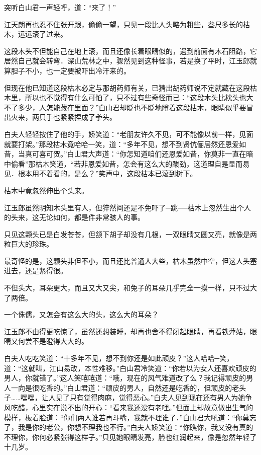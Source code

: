 \documentclass[12pt,oneside]{book}
\begin{document}
突听白山君一声轻呼，道：``来了！''

江天朗再也忍不住张开跟，偷偷一望，只见一段比人头略为粗些，叁尺多长的枯木，远远滚了过来。

这段木头不但能自己在地上滚，而且还像长着眼睛似的，遇到前面有木石阻路，它居然自己就会转弯．深山荒林之中，骤然见到这种怪事，若是换了平时，江玉郎就算胆子不小，也一定要被吓出冷汗来的。

但现在他已知道这段枯木必定与那胡药师有关，已猜出胡药师说不定就藏在这段枯木里，所以也不觉得有什么可怕了，只不过有些奇怪而已：``这段木头比枕头也大不了多少，人怎能藏在里面？''白山君却眨也不眨地瞪着这段枯木，眼睛似乎要冒出火来，两只手也紧紧捏成了拳头。

白夫人轻轻按住了他的手，娇笑道：``老朋友许久不见，可不能像以前一样，见面就要打架。''那段枯木竟哈哈一笑，道：``多年不见，想不到贤伉俪居然还恩爱如昔，当真可喜可贺。''白山君大声道：``你怎知道咱们还恩爱如昔，你莫非一直在暗中偷看''那枯木笑道，``若非恩爱如昔，怎会有这么大的酸劲，这道理自是显而易见．根本用不着看的，是么？''笑声中，这段枯本已滚到树下。

枯木中竟忽然伸出个头来。

江玉郎虽然明知木头里有人，但猝然间还是不免吓了─跳──枯木上忽然生出个人的头来，这无论如何，都是件非常骇人的事。

只见这颗头已是白发苍苍，但颔下胡子却没有几根，一双眼睛又圆又亮，就像是两粒巨大的珍珠。

最奇怪的是，这颗头非但不小，而且还比普通人大些，枯木虽然中空，但这人头塞进去，还是紧得很。

不但头大，耳朵更大，而且又大又尖，和兔子的耳朵几乎完全一摸一样，只不过大了两倍。

一个侏儒，又怎会有这么大的头，这么大的耳朵？

江玉郎不由得更吃惊了，虽然还想装睡，却再也舍不得闭起眼睛，再看铁萍姑，眼睛又何尝不是瞪得大大的。

白夫人吃吃笑道：``十多年不见，想不到你还是如此顽皮？''这人哈哈─笑，道：``这就叫，江山易改，本性难移。''白山君冷笑道：``你若以为女人还喜欢顽皮的男人，你就错了。''这人笑嘻嘻道：``哦，现在的风气难道改了么？我记得顽皮的男人一向是很吃香的。''白山君道：``顽皮的男人，自然还是吃香的，但顽皮的老头子\ldots\ldots 嘿嘿，让人见了只有觉得肉麻，觉得恶心。''白夫人见到现在还有男人为她争风吃醋，心里实在说不出的开心：``看来我还没有老哩。''但面上却故意做出生气的模样，板着脸道：``你们两人谁若再斗嘴，我就不理谁了．''白山君大吼道：``你莫忘了，我是你的老公，你想不理我也不行。''白夫人娇笑道：``你瞧你，我又没有真的不理你，你何必紧张得这样子。''只见她眼睛发亮，脸也红润起来，像是忽然年轻了十几岁。
\end{document}
